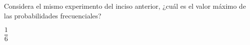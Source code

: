 Considera el mismo experimento del inciso anterior,
¿cuál es el valor máximo de las probabilidades frecuenciales?

\begin{oneparchoices}
    \choice $\dfrac{1}{6}$
\end{oneparchoices}